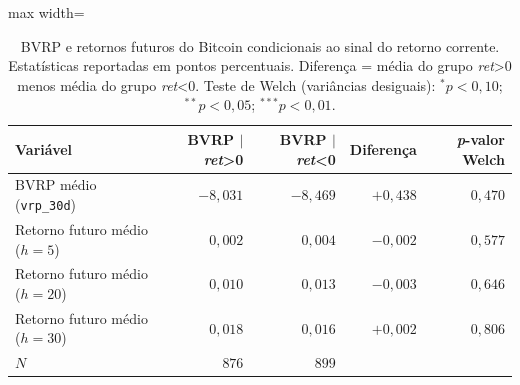 ﻿%
\begin{table}[htbp]
  \centering
  \caption{BVRP e retornos futuros do Bitcoin condicionais ao sinal do retorno
    corrente. Estatísticas reportadas em pontos percentuais.
    Diferença = média do grupo \textit{ret}>0 menos média do grupo \textit{ret}<0.
    Teste de Welch (variâncias desiguais): $^{*}p<0{,}10$; $^{**}p<0{,}05$; $^{***}p<0{,}01$.}
  \label{tab:cap9_sinal_retorno}
  \begin{adjustbox}{max width=\textwidth}
\begin{tabular}{lrrrr}
    \toprule
    \textbf{Variável} & \textbf{BVRP $|$ \textit{ret}>0} & \textbf{BVRP $|$ \textit{ret}<0} & \textbf{Diferença} & \textbf{\textit{p}-valor Welch} \\
    \midrule
    BVRP médio (\texttt{vrp\_30d}) & $-8,031$ & $-8,469$ & $+0,438$ & $0,470$ \\
    \midrule
    Retorno futuro médio ($h=5$) & $0,002$ & $0,004$ & $-0,002$ & $0,577$ \\
    Retorno futuro médio ($h=20$) & $0,010$ & $0,013$ & $-0,003$ & $0,646$ \\
    Retorno futuro médio ($h=30$) & $0,018$ & $0,016$ & $+0,002$ & $0,806$ \\
    \midrule
    $N$ & $876$ & $899$ & & \\
    \bottomrule
  \end{tabular}
\end{adjustbox}
\end{table}
